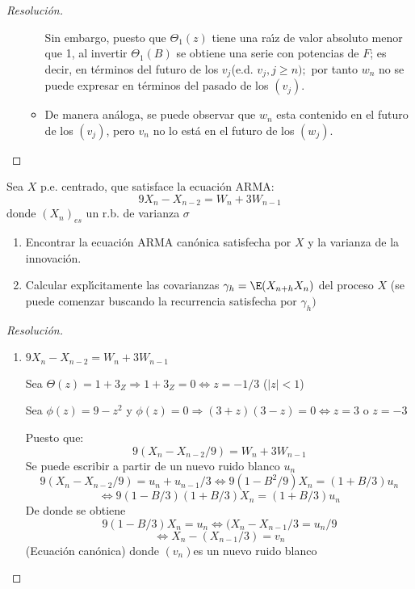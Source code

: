 \begin{ejemplo}
\begin{proof}[Resoluci\'{o}n]
\begin{enumerate}
\begin{itemize}
Sin embargo, puesto que $\Theta_{1} (z)$ tiene una ra\'{\i}z de valor 
absoluto menor que 1, al invertir $\Theta_{1} (B)$ se obtiene una serie 
con potencias de $F$; es decir, en t\'{e}rminos del futuro de los $v_{j} $(e.d. 
$v_{j}, j\ge n);$ por tanto $w_{{n}}$ no se puede expresar en 
t\'{e}rminos del pasado de los $(v_{j})$.

\item De manera an\'{a}loga, se puede observar que $w_{{n}}$ esta contenido en el futuro de los $(v_{{j}})$, pero $v_{n}$ no lo est\'{a} en el futuro de los $(w_{{j}})$.
\end{itemize} 
\end{enumerate}
\end{proof}
\end{ejemplo}


\begin{ejemplo}
Sea $X$ p.e. centrado, que satisface la ecuaci\'{o}n ARMA:
\[
9X_{n} -X_{n-2} =W_{n} +3W_{n-1} 
\]
donde $( X_{n} )_{es }$ un r.b. de varianza $\sigma $

\begin{enumerate}
\item Encontrar la ecuaci\'{o}n ARMA can\'{o}nica satisfecha por $X$ y la varianza de la innovaci\'{o}n. 
\item Calcular expl\'{\i}citamente las covarianzas $\gamma_{h} =\E(X_{n+h} X_{n} )$ del proceso $X$ (se puede comenzar buscando la recurrencia satisfecha por $\gamma_{h})$
\end{enumerate}

\begin{proof}[Resoluci\'{o}n]
\begin{enumerate}
\item $9X_{n} -X_{n-2} =W_{n} +3W_{n-1} $

Sea $\Theta (z)=1+3_{Z} \Rightarrow 1+3_{Z} =0 \Leftrightarrow z=-1/3$ ($\left| z \right|<1$)

Sea $\phi (z)=9-z^{2}$ y $\phi (z)=0\Rightarrow(3+z)(3-z)=0\Leftrightarrow z=3$ o $z=-3$

Puesto que:
\[
9(X_{n} -X_{n-2} /9)=W_{n} +3W_{n-1} 
\]
Se puede escribir a partir de un nuevo ruido blanco $u_{n}$
\[
9(X_{n} -X_{n-2} /9)=u_{n} +u_{n-1} /3\Leftrightarrow 9(1-B^{2}/9)X_{n} =(1+B/3)u_{n} 
\]
\[
\Leftrightarrow 9(1-B/3)(1+B/3)X_{n} =(1+B/3)u_{n} 
\]
De donde se obtiene 
\[
9(1-B/3)X_{n} =u_{n} \Leftrightarrow (X_{n} -X_{n-1} 
/3=u_{n} /9
\]
\[
 \Leftrightarrow X_{n} -(X_{n-1} /3)=v_{n}
\]
(Ecuaci\'{o}n can\'{o}nica) donde $(v_{n} )$es un nuevo ruido blanco 


\end{enumerate}
\end{proof}
\end{ejemplo}
